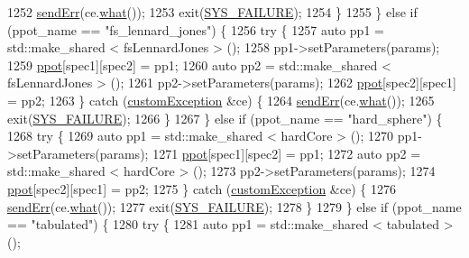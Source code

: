 \begin{DoxyCode}
1252             \hyperlink{utilities_8cpp_a6dacf3c3c19aa1e13a4d5a148fe5114e}{sendErr}(ce.\hyperlink{classcustom_exception_aeb6ab5848b038adfc68fde86a512f691}{what}());
1253             exit(\hyperlink{global_8h_a428dfe1ef0a6ff4b1fdebf275f6aff2e}{SYS\_FAILURE});
1254         \}
1255     \} \textcolor{keywordflow}{else} \textcolor{keywordflow}{if} (ppot\_name == \textcolor{stringliteral}{"fs\_lennard\_jones"}) \{
1256         \textcolor{keywordflow}{try} \{
1257             \textcolor{keyword}{auto} pp1 = std::make\_shared < fsLennardJones > ();
1258             pp1->setParameters(params);
1259             \hyperlink{classsim_system_ad2e290b5963f132e6a3a56cee35c8e9f}{ppot}[spec1][spec2] = pp1;
1260             \textcolor{keyword}{auto} pp2 = std::make\_shared < fsLennardJones > ();
1261             pp2->setParameters(params);
1262             \hyperlink{classsim_system_ad2e290b5963f132e6a3a56cee35c8e9f}{ppot}[spec2][spec1] = pp2;
1263         \} \textcolor{keywordflow}{catch} (\hyperlink{classcustom_exception}{customException} &ce) \{
1264             \hyperlink{utilities_8cpp_a6dacf3c3c19aa1e13a4d5a148fe5114e}{sendErr}(ce.\hyperlink{classcustom_exception_aeb6ab5848b038adfc68fde86a512f691}{what}());
1265             exit(\hyperlink{global_8h_a428dfe1ef0a6ff4b1fdebf275f6aff2e}{SYS\_FAILURE});
1266         \}
1267     \} \textcolor{keywordflow}{else} \textcolor{keywordflow}{if} (ppot\_name == \textcolor{stringliteral}{"hard\_sphere"}) \{
1268         \textcolor{keywordflow}{try} \{
1269             \textcolor{keyword}{auto} pp1 = std::make\_shared < hardCore > ();
1270             pp1->setParameters(params);
1271             \hyperlink{classsim_system_ad2e290b5963f132e6a3a56cee35c8e9f}{ppot}[spec1][spec2] = pp1;
1272             \textcolor{keyword}{auto} pp2 = std::make\_shared < hardCore > ();
1273             pp2->setParameters(params);
1274             \hyperlink{classsim_system_ad2e290b5963f132e6a3a56cee35c8e9f}{ppot}[spec2][spec1] = pp2;
1275         \} \textcolor{keywordflow}{catch} (\hyperlink{classcustom_exception}{customException} &ce) \{
1276             \hyperlink{utilities_8cpp_a6dacf3c3c19aa1e13a4d5a148fe5114e}{sendErr}(ce.\hyperlink{classcustom_exception_aeb6ab5848b038adfc68fde86a512f691}{what}());
1277             exit(\hyperlink{global_8h_a428dfe1ef0a6ff4b1fdebf275f6aff2e}{SYS\_FAILURE});
1278         \}
1279     \} \textcolor{keywordflow}{else} \textcolor{keywordflow}{if} (ppot\_name == \textcolor{stringliteral}{"tabulated"}) \{
1280         \textcolor{keywordflow}{try} \{
1281             \textcolor{keyword}{auto} pp1 = std::make\_shared < tabulated > ();

\end{DoxyCode}
